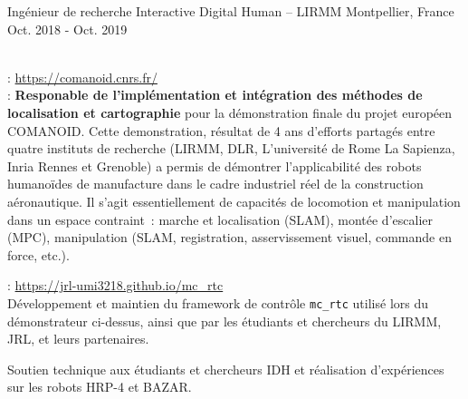 \begin{cventries}
  \cventry
    {Ingénieur de recherche} %
    {Interactive Digital Human -- LIRMM} %
    {Montpellier, France} %
    {Oct. 2018 - Oct. 2019} %
    {
      \begin{cvitems} %
        \item {}\\
          : \url{https://comanoid.cnrs.fr/}\\
          : \textbf{Responable de l'implémentation et intégration des méthodes de localisation et cartographie} pour la démonstration finale du projet européen COMANOID. Cette demonstration, résultat de 4 ans d'efforts partagés entre quatre instituts de recherche (LIRMM, DLR, L'université de Rome La Sapienza, Inria Rennes et Grenoble) a permis de démontrer l'applicabilité des robots humanoïdes de manufacture dans le cadre industriel réel de la construction aéronautique. Il s'agit essentiellement de capacités de locomotion et manipulation dans un espace contraint~: marche et localisation (SLAM), montée d’escalier (MPC), manipulation (SLAM, registration, asservissement visuel, commande en force, etc.).
        \item {}: \url{https://jrl-umi3218.github.io/mc_rtc}\\
        Développement et maintien du framework de contrôle {\tt mc\_rtc} utilisé lors du  démonstrateur ci-dessus, ainsi que par les étudiants et chercheurs du LIRMM, JRL, et leurs partenaires.
        \item Soutien technique aux étudiants et chercheurs IDH et réalisation d'expériences sur les robots HRP-4 et BAZAR.
      \end{cvitems}
    }


\end{cventries}
